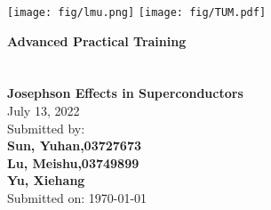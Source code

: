 \begin{titlepage}

    \texttt{[image: fig/lmu.png]}
	\hspace*{\fill}
	\texttt{[image: fig/TUM.pdf]}

	\vspace*{1.8cm}
	\begin{center}
		\Huge \textbf{Advanced Practical Training}\\
		\Huge \textbf{}\\[0.4cm]
		\vspace*{\fill}
		\huge {} \\[0.15cm]
		\Huge \textbf{Josephson Effects in Superconductors} \\[0,7 cm] 
		\LARGE July 13, 2022\\
		\vspace*{\fill}
		\LARGE Submitted by:\\[0,3 cm]
		\LARGE \textbf{Sun, Yuhan,03727673} \\[0,3 cm]
		\LARGE \textbf{Lu, Meishu,03749899}\\[0,3 cm]
		\LARGE \textbf{Yu, Xiehang} \\[1,4 cm]
		\LARGE Submitted on: \today\\
	\end{center}
\end{titlepage}




